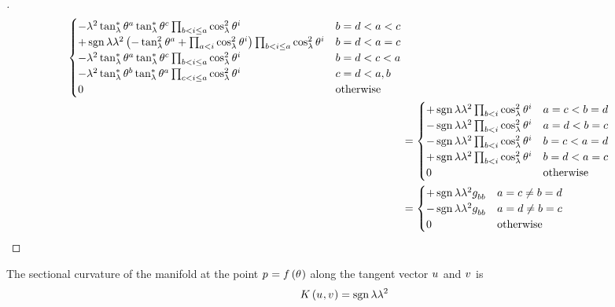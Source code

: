 \documentclass[../main.tex]{subfiles}
\begin{document}
\begin{proof}[]
\begin{align*}
\begin{cases}
-\lambda^2\tan_\lambda^\ast\tensor{\theta}{^a}\tan_\lambda^\ast\tensor{\theta}{^c}\prod_{b<i\le a}\cos_\lambda^2\tensor{\theta}{^i}
&\text{\(b=d<a<c\)}\\
+\sign{\lambda}\lambda^2
\left(
-\tan_\lambda^2\tensor{\theta}{^a}
+\prod_{a<i}\cos_\lambda^2\tensor{\theta}{^i}
\right)
\prod_{b<i\le a}\cos_\lambda^2\tensor{\theta}{^i}
&\text{\(b=d<a=c\)}\\
-\lambda^2\tan_\lambda^\ast\tensor{\theta}{^a}\tan_\lambda^\ast\tensor{\theta}{^c}\prod_{b<i\le a}{\cos_\lambda^2\tensor{\theta}{^i}}
&\text{\(b=d<c<a\)}\\
-\lambda^2\tan_\lambda^\ast\tensor{\theta}{^b}\tan_\lambda^\ast\tensor{\theta}{^a}\prod_{c<i\le a}\cos_\lambda^2\tensor{\theta}{^i}
&\text{\(c=d<a,b\)}\\
0&\text{otherwise}\\
\end{cases}\\
&=\begin{cases}
+\sign{\lambda}\lambda^2
\prod_{b<i}\cos_\lambda^2\tensor{\theta}{^i}
&\text{\(a=c<b=d\)}\\
-\sign{\lambda}\lambda^2
\prod_{b<i}\cos_\lambda^2\tensor{\theta}{^i}
&\text{\(a=d<b=c\)}\\
-\sign{\lambda}\lambda^2
\prod_{b<i}\cos_\lambda^2\tensor{\theta}{^i}
&\text{\(b=c<a=d\)}\\
+\sign{\lambda}\lambda^2
\prod_{b<i}\cos_\lambda^2\tensor{\theta}{^i}
&\text{\(b=d<a=c\)}\\
0&\text{otherwise}\\
\end{cases} \\
&=\begin{cases}
+\sign{\lambda}\lambda^2\tensor{g}{_b_b}
&\text{\(a=c\ne b=d\)}\\
-\sign{\lambda}\lambda^2\tensor{g}{_b_b}
&\text{\(a=d\ne b=c\)}\\
0&\text{otherwise}\\
\end{cases}\qedhere
\end{align*}
\end{proof}
\begin{lemma}\label{M:SectionalCurvature}
The sectional curvature of the manifold
at the point \(\tensor{p}{}=f\left(\tensor{\theta}{}\right)\)
along the tangent vector \(\tensor{u}{}\) and \(\tensor{v}{}\)
is
\[
K\left(\tensor{u}{},\tensor{v}{}\right)=\sign{\lambda}\lambda^2
\]
\end{lemma}
\end{document}
